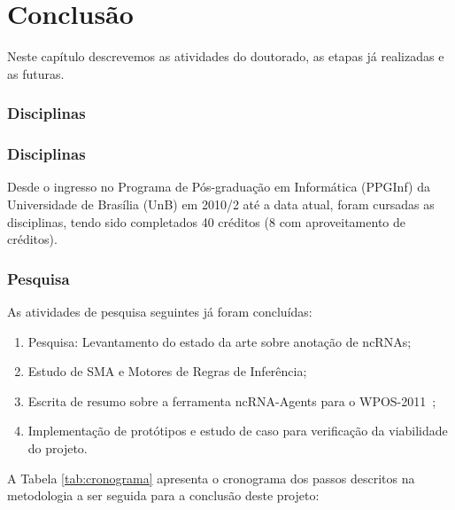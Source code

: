 \chapter{Conclusão}
\label{sec:Conclusão}

Neste capítulo descrevemos as atividades do doutorado, as etapas já realizadas e as futuras.


\subsection{Disciplinas} \label{sec:AtividadesRealizadas}



\subsection{Disciplinas} \label{sec:AtividadesRealizadas}

Desde o ingresso no Programa de Pós-graduação em Informática (PPGInf) da
Universidade de Brasília (UnB) em 2010/2 até a data atual, foram cursadas as disciplinas, tendo sido completados 40 créditos (8 com aproveitamento de créditos). 

\subsection{Pesquisa} \label{sec:cronogramaAtividades}

As atividades de pesquisa seguintes já foram concluídas:

\begin{enumerate}
\item Pesquisa: Levantamento do estado da arte sobre anotação de ncRNAs;
\item Estudo de SMA e Motores de Regras de Inferência;
\item Escrita de resumo sobre a ferramenta ncRNA-Agents para o WPOS-2011~\citep{wosley2011:2011};
\item Implementação de protótipos e estudo de caso para verificação da viabilidade do projeto.
\end{enumerate}

A Tabela \ref{tab:cronograma} apresenta o cronograma dos passos descritos na metodologia a ser seguida para a conclusão deste projeto:  


